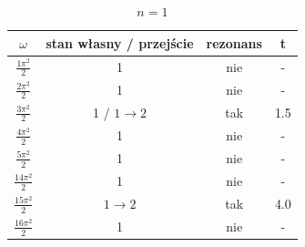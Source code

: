 \documentclass[11pt,a4paper]{article}
\begin{document}
\begin{table}[h!]
\vspace{1.5cm}
\begin{center}
\begin{tabular}{|| c | c | c | c ||}
    \hline
    $\omega$ & stan własny / przejście & rezonans & t\\
    \hline
    $\frac{1\pi^2}{2}$ & 1 & nie & -\\
    \hline
    $\frac{2\pi^2}{2}$ & 1 & nie & -\\
    \hline
    $\frac{3\pi^2}{2}$ & 1 / $1\rightarrow2$ & tak & 1.5\\
    \hline
    $\frac{4\pi^2}{2}$ & 1 & nie & -\\
    \hline
    $\frac{5\pi^2}{2}$ & 1 & nie & -\\
    \hline
    \hline
    $\frac{14\pi^2}{2}$ & 1 & nie & -\\
    \hline
    $\frac{15\pi^2}{2}$ & $1\rightarrow2$ & tak & 4.0\\
    \hline
    $\frac{16\pi^2}{2}$ & 1 & nie & -\\
    \hline
\end{tabular}
\caption{$n=1$}
\end{center}
\end{table}
\end{document}

